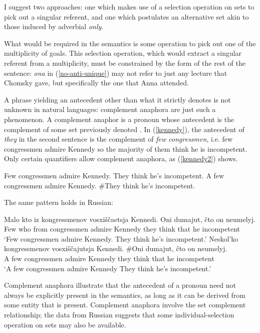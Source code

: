 I suggest two approaches: one which makes use of a selection operation on sets to pick out a singular referent, and one which postulates an alternative set akin to those induced by adverbial \textit{only}.

What would be required in the semantics is some operation to pick out one of the multiplicity of goals. This selection operation, which would extract a singular referent from a multiplicity, must be constrained by the form of the rest of the sentence: \textit{ona} in (\ref{no-anti-unique}) may not refer to just any lecture that Chomsky gave, but specifically the one that Anna attended.

A phrase yielding an antecedent other than what it strictly denotes is not unknown in natural languages: complement anaphora are just such a phenomenon. A complement anaphor is a pronoun whose antecedent is the complement of some set previously denoted \citep{nouwen03, schwarz09}. In (\ref{kennedy}), the antecedent of \textit{they} in the second sentence is the complement of \textit{few congressmen}, i.e. few congressmen admire Kennedy so the majority of them think he is incompetent. Only certain quantifiers allow complement anaphora, as (\ref{kennedy2}) shows.

\begin{exe}
	\ex \label{kennedy} Few congressmen admire Kennedy. They think he's incompetent.
	\ex \label{kennedy2} A few congressmen admire Kennedy. \#They think he's incompetent.
\end{exe}

The same pattern holds in Russian:

\begin{exe}
	\ex \gll Malo kto iz kongressmenov vosxi\v{s}\v{c}aetsja Kennedi. Oni dumajut, \v{c}to on neumelyj.\\
	Few who from congressmen admire Kennedy they think that he incompetent\\
	\glt `Few congressmen admire Kennedy. They think he's incompetent.'
	\ex \gll Neskol'ko kongressmenov vosxi\v{s}\v{c}ajutsja Kennedi. \#Oni dumajut, \v{c}to on neumelyj.\\
	{A few} congressmen admire Kennedy they think that he incompetent\\
	\glt `A few congressmen admire Kennedy They think he's incompetent.'
\end{exe}

Complement anaphora illustrate that the antecedent of a pronoun need not always be explicitly present in the semantics, as long as it can be derived from some entity that is present. Complement anaphora involve the set complement relationship; the data from Russian suggests that some individual-selection operation on sets may also be available.

